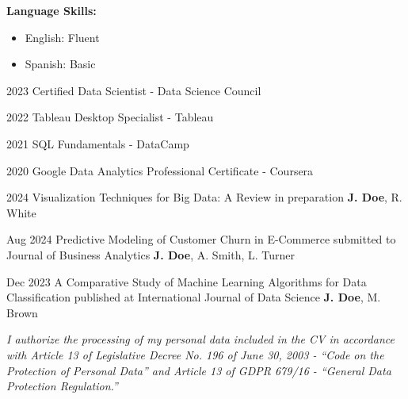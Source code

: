 \documentclass[9pt]{cvitae}
\begin{document}
\textbf{Language Skills:} \vspace{5pt}
\begin{itemize}
    \item English: Fluent
    \item Spanish: Basic
\end{itemize}


\begin{entrylist}
    \centry
        {2023}
        {Certified Data Scientist - Data Science Council}
        {}
        {}

    \centry
        {2022}
        {Tableau Desktop Specialist - Tableau}
        {}
        {}

    \centry
        {2021}
        {SQL Fundamentals - DataCamp}
        {}
        {}
        
    \centry
        {2020}
        {Google Data Analytics Professional Certificate - Coursera}
        {}
        {}
\end{entrylist}


\begin{entrylist}
    \pentry
    {2024}
    {Visualization Techniques for Big Data: A Review}
    {in preparation}
    {\textbf{J. Doe}, R. White}

    \pentry
        {Aug 2024}
        {Predictive Modeling of Customer Churn in E-Commerce}
        {submitted to Journal of Business Analytics}
        {\textbf{J. Doe}, A. Smith, L. Turner}

    \pentry
        {Dec 2023}
        {A Comparative Study of Machine Learning Algorithms for Data Classification}
        {published at International Journal of Data Science}
        {\textbf{J. Doe}, M. Brown}
\end{entrylist}


\vfill
\footnotesize
\begin{center}
    \textit{I authorize the processing of my personal data included in the CV in accordance with Article 13 of Legislative Decree No. 196 of June 30, 2003 - “Code on the Protection of Personal Data” and Article 13 of GDPR 679/16 - “General Data Protection Regulation.”}
\end{center}
\end{document}
